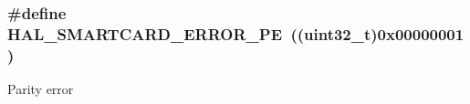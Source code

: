 \subsubsection[{\texorpdfstring{H\+A\+L\+\_\+\+S\+M\+A\+R\+T\+C\+A\+R\+D\+\_\+\+E\+R\+R\+O\+R\+\_\+\+PE}{HAL_SMARTCARD_ERROR_PE}}]{\setlength{\rightskip}{0pt plus 5cm}\#define H\+A\+L\+\_\+\+S\+M\+A\+R\+T\+C\+A\+R\+D\+\_\+\+E\+R\+R\+O\+R\+\_\+\+PE~((uint32\+\_\+t)0x00000001)}\hypertarget{group___s_m_a_r_t_c_a_r_d___error___code_gaa84e746eaf686e07ef7b9c2e3afd11a8}{}\label{group___s_m_a_r_t_c_a_r_d___error___code_gaa84e746eaf686e07ef7b9c2e3afd11a8}
Parity error 